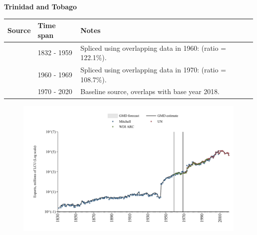 \documentclass[12pt,a4paper,landscape]{article}
\begin{document}
\begin{adjustbox}{max totalsize={\paperwidth}{\paperheight},center}
\begin{minipage}[t][\textheight][t]{\textwidth}
\vspace*{0.5cm}
{}
\begin{center}
{\Large\bfseries Trinidad and Tobago}
\end{center}
\vspace{0.5cm}
\begin{table}[H]
\centering
\small
\begin{tabular}{|l|l|l|}
\hline
\textbf{Source} & \textbf{Time span} & \textbf{Notes} \\
\hline
\rowcolor{white}\cite{Mitchell}& 1832 - 1959 &Spliced using overlapping data in 1960: (ratio = 122.1\%).\\
\rowcolor{lightgray}\cite{WDI_ARC}& 1960 - 1969 &Spliced using overlapping data in 1970: (ratio = 108.7\%).\\
\rowcolor{white}\cite{UN}& 1970 - 2020 &Baseline source, overlaps with base year 2018.\\
\hline
\end{tabular}
\end{table}
\begin{figure}[H]
\centering
\includegraphics[width=\textwidth,height=0.6\textheight,keepaspectratio]{graphs/TTO_exports.pdf}
\end{figure}
\end{minipage}
\end{adjustbox}
\end{document}
